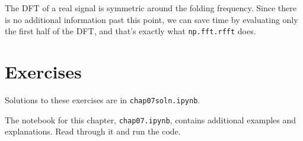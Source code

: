 The DFT of a real signal is symmetric around the folding frequency.
Since there is no additional information past this point, we can
save time by evaluating only the first half of the DFT,
and that's exactly what {\tt np.fft.rfft} does.



\section{Exercises}

Solutions to these exercises are in {\tt chap07soln.ipynb}.


\begin{exercise}
	The notebook for this chapter, {\tt chap07.ipynb}, contains
	additional examples and explanations.  Read through it and run
	the code.
\end{exercise}


